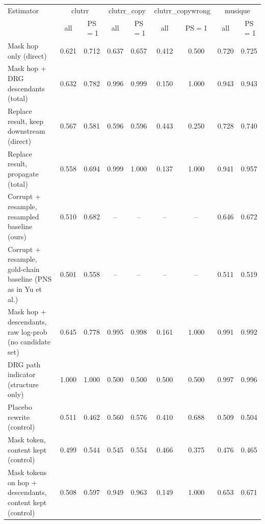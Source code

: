 \begin{tabular}{lcccccccc}
\toprule
Estimator & \multicolumn{2}{c}{clutrr} & \multicolumn{2}{c}{clutrr\_copy} & \multicolumn{2}{c}{clutrr\_copywrong} & \multicolumn{2}{c}{musique} \\
 & all & PS$=$1 & all & PS$=$1 & all & PS$=$1 & all & PS$=$1 \\
\midrule
Mask hop only (direct) & 0.621 & 0.712 & 0.637 & 0.657 & 0.412 & 0.500 & 0.720 & 0.725 \\
Mask hop + DRG descendants (total) & 0.632 & 0.782 & 0.996 & 0.999 & 0.150 & 1.000 & 0.943 & 0.943 \\
Replace result, keep downstream (direct) & 0.567 & 0.581 & 0.596 & 0.596 & 0.443 & 0.250 & 0.728 & 0.740 \\
Replace result, propagate (total) & 0.558 & 0.694 & 0.999 & 1.000 & 0.137 & 1.000 & 0.941 & 0.957 \\
Corrupt + resample, resampled baseline (ours) & 0.510 & 0.682 & -- & -- & -- & -- & 0.646 & 0.672 \\
Corrupt + resample, gold-chain baseline (PNS as in Yu et al.) & 0.501 & 0.558 & -- & -- & -- & -- & 0.511 & 0.519 \\
Mask hop + descendants, raw log-prob (no candidate set) & 0.645 & 0.778 & 0.995 & 0.998 & 0.161 & 1.000 & 0.991 & 0.992 \\
DRG path indicator (structure only) & 1.000 & 1.000 & 0.500 & 0.500 & 0.500 & 0.500 & 0.997 & 0.996 \\
Placebo rewrite (control) & 0.511 & 0.462 & 0.560 & 0.576 & 0.410 & 0.688 & 0.509 & 0.504 \\
Mask token, content kept (control) & 0.499 & 0.544 & 0.545 & 0.554 & 0.466 & 0.375 & 0.476 & 0.465 \\
Mask tokens on hop + descendants, content kept (control) & 0.508 & 0.597 & 0.949 & 0.963 & 0.149 & 1.000 & 0.653 & 0.671 \\
\bottomrule
\end{tabular}
